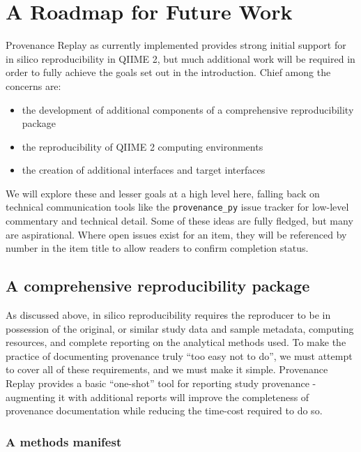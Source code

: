 \chapter{A Roadmap for Future Work}
\label{chapter:future_work}

Provenance Replay as currently implemented provides strong initial support for
in silico reproducibility in QIIME 2, but much additional work will be required
in order to fully achieve the goals set out in the introduction. Chief among the
concerns are:

\begin{itemize}
    \item the development of additional components of a comprehensive reproducibility package
    \item the reproducibility of QIIME 2 computing environments
    \item the creation of additional interfaces and target interfaces
\end{itemize}

We will explore these and lesser goals at a high level here, falling back on
technical communication tools like the \texttt{provenance\_py} issue tracker
\parencite{keefe_issues_2021} for low-level commentary and technical detail.
Some of these ideas are fully fledged, but many are aspirational. Where open
issues exist for an item, they will be referenced by number in the item title to
allow readers to confirm completion status.

\section{A comprehensive reproducibility package}

As discussed above, in silico reproducibility requires the reproducer to be in
possession of the original, or similar study data and sample metadata, computing
resources, and complete reporting on the analytical methods used. To make the
practice of documenting provenance truly “too easy not to do”, we must attempt
to cover all of these requirements, and we must make it simple. Provenance
Replay provides a basic “one-shot” tool for reporting study provenance -
augmenting it with additional reports will improve the completeness of
provenance documentation while reducing the time-cost required to do so.

\subsection{A methods manifest \parencite[Issue 75]{keefe_issues_2021}}
\label{methods_manifest}

